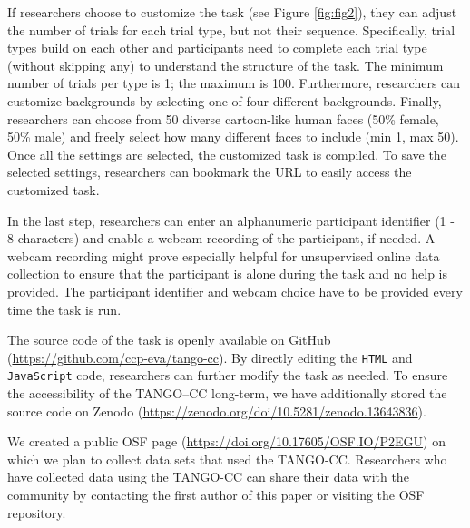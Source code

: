 \documentclass[
  man,floatsintext]{apa7}
\begin{document}
If researchers choose to customize the task (see Figure \ref{fig:fig2}), they can adjust the number of trials for each trial type, but not their sequence.
Specifically, trial types build on each other and participants need to complete each trial type (without skipping any) to understand the structure of the task.
The minimum number of trials per type is 1; the maximum is 100.
Furthermore, researchers can customize backgrounds by selecting one of four different backgrounds.
Finally, researchers can choose from 50 diverse cartoon-like human faces (50\% female, 50\% male) and freely select how many different faces to include (min 1, max 50).
Once all the settings are selected, the customized task is compiled.
To save the selected settings, researchers can bookmark the URL to easily access the customized task.

In the last step, researchers can enter an alphanumeric participant identifier (1 - 8 characters) and enable a webcam recording of the participant, if needed.
A webcam recording might prove especially helpful for unsupervised online data collection to ensure that the participant is alone during the task and no help is provided.
The participant identifier and webcam choice have to be provided every time the task is run.

The source code of the task is openly available on GitHub (\url{https://github.com/ccp-eva/tango-cc}).
By directly editing the \texttt{HTML} and \texttt{JavaScript} code, researchers can further modify the task as needed.
To ensure the accessibility of the TANGO--CC long-term, we have additionally stored the source code on Zenodo (\url{https://zenodo.org/doi/10.5281/zenodo.13643836}).

We created a public OSF page (\url{https://doi.org/10.17605/OSF.IO/P2EGU}) on which we plan to collect data sets that used the TANGO-CC.
Researchers who have collected data using the TANGO-CC can share their data with the community by contacting the first author of this paper or visiting the OSF repository.
\end{document}
